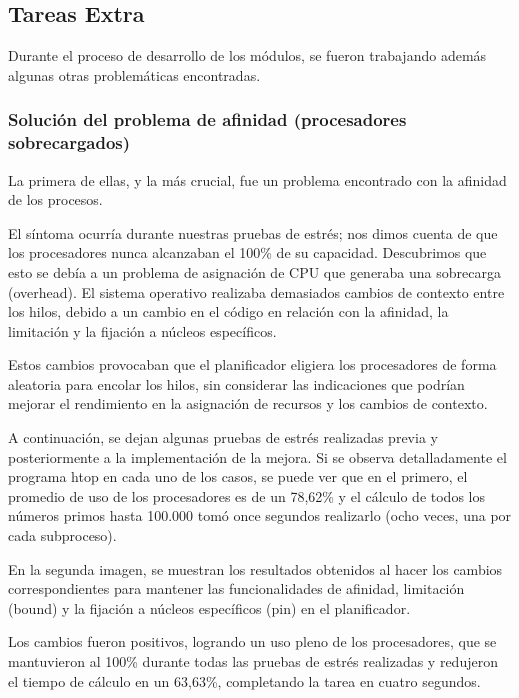 \subsection{Tareas Extra}

Durante el proceso de desarrollo de los módulos, se fueron trabajando además algunas otras problemáticas encontradas.


\subsubsection{Solución del problema de afinidad (procesadores sobrecargados)}

La primera de ellas, y la más crucial, fue un problema encontrado con la afinidad de los procesos.

El síntoma ocurría durante nuestras pruebas de estrés; nos dimos cuenta de que los procesadores nunca alcanzaban el 100\% de su capacidad. Descubrimos que esto se debía a un problema de asignación de CPU que generaba una sobrecarga (overhead). El sistema operativo realizaba demasiados cambios de contexto entre los hilos, debido a un cambio en el código en relación con la afinidad, la limitación y la fijación a núcleos específicos.

Estos cambios provocaban que el planificador eligiera los procesadores de forma aleatoria para encolar los hilos, sin considerar las indicaciones que podrían mejorar el rendimiento en la asignación de recursos y los cambios de contexto.


A continuación, se dejan algunas pruebas de estrés realizadas previa y posteriormente a la implementación de la mejora. Si se observa detalladamente el programa htop en cada uno de los casos, se puede ver que en el primero, el promedio de uso de los procesadores es de un 78,62\% y el cálculo de todos los números primos hasta 100.000 tomó once segundos realizarlo (ocho veces, una por cada subproceso).

En la segunda imagen, se muestran los resultados obtenidos al hacer los cambios correspondientes para mantener las funcionalidades de afinidad, limitación (bound) y la fijación a núcleos específicos (pin) en el planificador.

Los cambios fueron positivos, logrando un uso pleno de los procesadores, que se mantuvieron al 100\% durante todas las pruebas de estrés realizadas y redujeron el tiempo de cálculo en un 63,63\%, completando la tarea en cuatro segundos.

